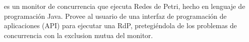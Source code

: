 \section{\javapetriconcurrencymonitor}
\label{sec:java_petri_concurrency_monitor}

\javapetriconcurrencymonitor es un monitor de concurrencia que ejecuta Redes
de Petri, hecho en lenguaje de programación Java.
Provee al usuario de una interfaz de programación de aplicaciones (API) para
ejecutar una RdP, pretegiéndola de los problemas de concurrencia con la
exclusion mutua del monitor.
